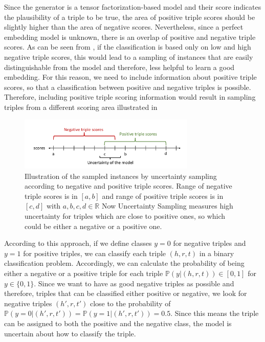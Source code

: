 Since the generator is a tensor factorization-based model and their score indicates the plausibility of a triple to be true, the area of positive triple scores should be slightly higher than the area of negative scores.
Nevertheless, since a perfect embedding model is unknown, there is an overlap of positive and negative triple scores.
As can be seen from , if the classification is based only on low and high negative triple scores, this would lead to a sampling of instances that are easily distinguishable from the model and therefore, less helpful to learn a good embedding.
For this reason, we need to include information about positive triple scores, so that a classification between positive and negative triples is possible.
Therefore, including positive triple scoring information would result in sampling triples from a different scoring area illustrated in 
\begin{figure}[t]
  \centering
    \includegraphics[width=0.75\textwidth]{figures/positiveVsNegativeApproach.pdf}
  \caption{Illustration of the sampled instances by uncertainty sampling according to negative and positive triple scores.
  Range of negative triple scores is in $[a, b]$ and range of positive triple scores is in  $[c, d]$ with $a,b,c,d \in \mathbb{R}$
  Now Uncertainty Sampling measures high uncertainty for triples which are close to positive ones, so which could be either a negative or a positive one.}
  \label{fig:positiveVsNegativeApproach}
\end{figure}
According to this approach, if we define classes $y = 0$  for negative triples and $y = 1$ for positive triples, we can classify each triple $(h,r,t)$ in a binary classification problem.
Accordingly, we can calculate the probability of being either a negative or a positive triple for each triple $\mathbb{P}(y| (h,r,t)) \in [0,1]$ for $y \in \{0,1\}$.
Since we want to have as good negative triples as possible and therefore, triples that can be classified either positive or negative, we look for negative triples $(h',r,t')$ close to the probability of $\mathbb{P}(y = 0| (h',r,t')) = \mathbb{P}(y = 1| (h',r,t')) = 0.5$.
Since this means the triple can be assigned to both the positive and the negative class, the model is uncertain about how to classify the triple.





